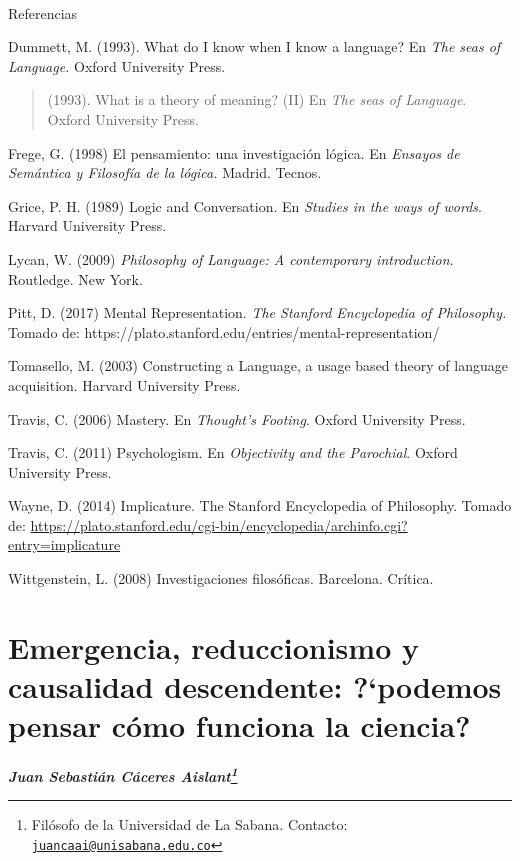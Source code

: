 \documentclass[]{book}
\newcommand{\autor}[1]{            %
  \begin{center}                   %
    \vspace*{-3.5em}               %
    \textbf{\textit{\large #1}}    %
    \vspace*{+4em}                 %
  \end{center}
}
\begin{document}
\emph{\\
}

Referencias

Dummett, M. (1993). What do I know when I know a language? En \emph{The
seas of Language.} Oxford University Press.

\begin{quote}
(1993). What is a theory of meaning? (II) En \emph{The seas of
Language}. Oxford University Press.
\end{quote}

Frege, G. (1998) El pensamiento: una investigación lógica. En
\emph{Ensayos de Semántica y Filosofía de la lógica.} Madrid. Tecnos.

Grice, P. H. (1989) Logic and Conversation. En \emph{Studies in the ways
of words}. Harvard University Press.

Lycan, W. (2009) \emph{Philosophy of Language: A contemporary
introduction}. Routledge. New York.

Pitt, D. (2017) Mental Representation. \emph{The Stanford Encyclopedia
of Philosophy.} Tomado de:
https://plato.stanford.edu/entries/mental-representation/

Tomasello, M. (2003) Constructing a Language, a usage based theory of
language acquisition. Harvard University Press.

Travis, C. (2006) Mastery. En \emph{Thought's Footing}. Oxford
University Press.

Travis, C. (2011) Psychologism. En \emph{Objectivity and the Parochial}.
Oxford University Press.

Wayne, D. (2014) Implicature. The Stanford Encyclopedia of Philosophy.
Tomado de:
\url{https://plato.stanford.edu/cgi-bin/encyclopedia/archinfo.cgi?entry=implicature}

Wittgenstein, L. (2008) Investigaciones filosóficas. Barcelona. Crítica.

\chapter{\texorpdfstring{\textbf{Emergencia, reduccionismo y causalidad
descendente: ?`podemos pensar cómo funciona la
ciencia?}}{Emergencia, reduccionismo y causalidad descendente: ?`podemos pensar cómo funciona la ciencia?}}\label{emergencia-reduccionismo-y-causalidad-descendente-podemos-pensar-cuxf3mo-funciona-la-ciencia}

\autor{Juan Sebastián Cáceres Aislant\footnote{Filósofo de la
  Universidad de La Sabana. Contacto:
  \href{mailto:juancaai@unisabana.edu.co}{\nolinkurl{juancaai@unisabana.edu.co}}}}
\end{document}
